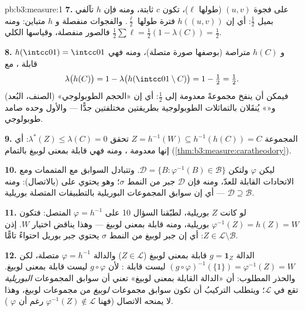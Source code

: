 \begin{solution}{pb:b3:measure:1}
\textbf{7.} على فجوة $(u, v)$ (طولها $\ell$)، تكون $c$ ثابتة،
ومنه فإن $h$ تآلفي بميل $\frac12$: أي إن $h((u,v))$ فترة طولها
$\frac\ell2$. والفجوات منفصلة و $h$ متباين: ومنه فالصور منفصلة،
وقياسها الكلي $\frac12\sum\ell = \frac12(1 - \lambda(C)) = \frac12$.

\textbf{8.} $h(\intcc01) = \intcc01$ و $h(C)$ متراصة (بوصفها صورة متصلة)، ومنه
فهي قابلة ، مع
\[
\lambda\bigl(h(C)\bigr) = 1 -
\lambda\bigl(h(\intcc01\setminus C)\bigr) = 1 - \tfrac12 =
\tfrac12 .
\]
فيمكن  أن ينفخ مجموعةً معدومة  إلى 
$\frac12$: أي إن «الحجم الطوبولوجي» (الصنف، البُعد) و«»
يُنقَلان بالتماثلات الطوبولوجية بطريقتين مختلفتين جدًّا ---
والأول وحده صامد طوبولوجي.

\textbf{9.} المجموعة $Z = h^{-1}(W) \subseteq h^{-1}(h(C)) = C$ تحقق $\lambda^*(Z) \leq \lambda(C) = 0$: أي إنها معدومة
، ومنه فهي قابلة  بمعنى لوبيغ بالتمام
(\cref{thm:b3:measure:caratheodory}).

\textbf{10.} ليكن $\varphi$  ولتكن $\mathcal D = \{B
: \varphi^{-1}(B) \in \mathcal B\}$. وتتبادل
السوابق مع المتممات ومع الاتحادات القابلة للعدّ، ومنه فإن
$\mathcal D$ جبر من النمط $\sigma$؛ وهو يحتوي على  (بالاتصال): ومنه $\mathcal D \supseteq \mathcal B$ --- أي إن سوابق المجموعات
البوريلية بالتطبيقات المتصلة بوريلية.

\textbf{11.} لو كانت $Z$ بوريلية، لطبّقنا السؤال 10 على $\varphi = h^{-1}$
المتصل: فتكون $\varphi^{-1}(Z) = h(Z) = W$ بوريلية، ومنه قابلة  بمعنى لوبيغ
--- وهذا يناقض اختيار $W$. إذن $Z \in \mathcal L \setminus \mathcal B$: أي إن جبر لوبيغ من
النمط $\sigma$ يحتوي جبر بوريل احتواءً تامًّا.

\textbf{12.} الدالة $g = \mathbf 1_Z$ قابلة  بمعنى لوبيغ ($Z \in
\mathcal L$)
والدالة $\varphi = h^{-1}$ متصلة، لكن $(g\circ\varphi)^{-1}(\{1\}) = \varphi^{-1}(Z) = W$ ليست قابلة : لأن
$g \circ \varphi$ ليست قابلة  بمعنى لوبيغ. والحذر المطلوب: أن
«الدالة القابلة  بمعنى لوبيغ» تعني أن سوابق المجموعات
\emph{البوريلية} تقع في $\mathcal L$؛ ويتطلب التركيبُ أن تكون
سوابق مجموعات \emph{لوبيغ} من مجموعات لوبيغ، وهذا لا يمنحه
الاتصال (فهنا $\varphi^{-1}(Z) \notin
\mathcal L$ رغم أن $\varphi$ ).


\end{solution}
